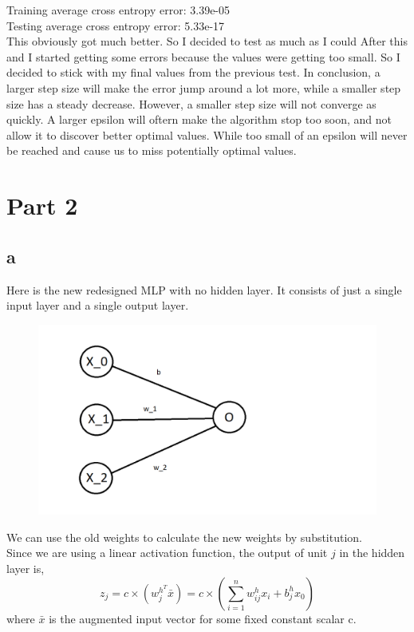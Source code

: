 \documentclass{article}
\begin{document}
Training average cross entropy error: 3.39e-05 \\
Testing average cross entropy error: 5.33e-17 \\

This obviously got much better. So I decided to test as much as I could
After this and I started getting some errors because the values were
getting too small. So I decided to stick with my final values from the
previous test. In conclusion, a larger step size will make the error
jump around a lot more, while a smaller step size has a steady decrease.
However, a smaller step size will not converge as quickly. A larger epsilon
will oftern make the algorithm stop too soon, and not allow it to discover
better optimal values. While too small of an epsilon will never be reached
and cause us to miss potentially optimal values.


\section{Part 2}


\subsection{a}
Here is the new redesigned MLP with no hidden layer. It consists of
just a single input layer and a single output layer.

\newpage

\begin{figure}[h!]
  \includegraphics[width=\linewidth]{NewNeuralNet.png}
\end{figure}

We can use the old weights to calculate the new weights
by substitution. \\

Since we are using a linear activation function, the output of unit $j$
in the hidden layer is,
\begin{equation*}
  z_j=c\times(w_j^{h^T}\bar{x})=c\times(\sum_{i=1}^{n}w_{ij}^hx_i+
  b_{j}^hx_0)
\end{equation*}
where $\bar{x}$ is the augmented input vector for some fixed constant scalar
c. \\
\end{document}
